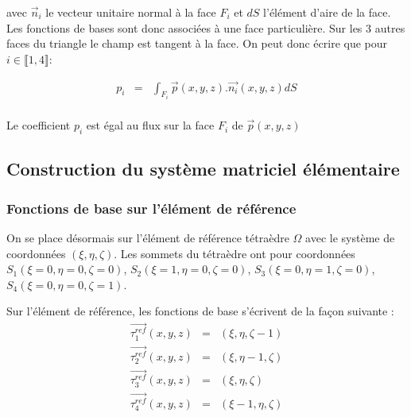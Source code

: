 \documentclass[a4paper,12pt]{article}
\begin{document}
avec $\vec{n}_{i}$ le vecteur unitaire normal à la face $F_{i}$ et $dS$ l'élément d'aire de la face. Les fonctions de bases sont donc associées à une face particulière.
Sur les 3 autres faces du triangle le champ est tangent à la face.
On peut donc écrire que pour $i \in \llbracket 1,4 \rrbracket$:

\begin{eqnarray*}
p_{i} &=& \int_{F_{i}} {\vec{p}(x,y,z).\vec{n_{i}}(x,y,z) dS}\\
\end{eqnarray*}

Le coefficient $p_{i}$ est égal au flux sur la face $F_{i}$ de $\vec{p}(x,y,z)$
\subsection{Construction du système matriciel élémentaire}
\subsubsection{Fonctions de base sur l'élément de référence}
On se place désormais sur l'élément de référence tétraèdre $\hat{\Omega}$ avec le système de coordonnées $(\xi, \eta, \zeta)$. 
Les sommets du tétraèdre ont pour coordonnées $S_{1} (\xi = 0, \eta = 0, \zeta=0)$, $S_{2} (\xi = 1, \eta = 0, \zeta=0)$,
$S_{3} (\xi = 0, \eta = 1, \zeta=0)$, $S_{4} (\xi = 0, \eta = 0, \zeta=1)$.
\begin{center}
\end{center}
Sur l'élément de référence, les fonctions de base s'écrivent de la façon suivante :
\begin{eqnarray*}
\vec{\tau_{1}^{ref}}(x,y,z) &=& (\xi,\eta,\zeta-1)\\
\vec{\tau_{2}^{ref}}(x,y,z) &=& (\xi,\eta-1,\zeta)\\
\vec{\tau_{3}^{ref}}(x,y,z) &=& (\xi,\eta,\zeta)\\
\vec{\tau_{4}^{ref}}(x,y,z) &=& (\xi-1,\eta,\zeta)
\end{eqnarray*}
\end{document}
